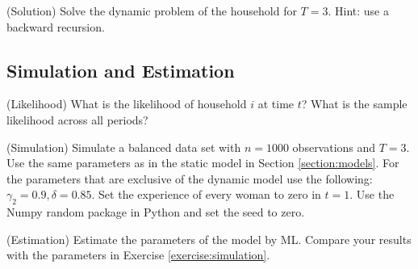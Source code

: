 \begin{exercise} (Solution)
Solve the dynamic problem of the household for $T=3$. Hint: use a backward recursion.
\end{exercise}

\subsection{Simulation and Estimation}

\begin{exercise} (Likelihood)
What is the likelihood of household $i$ at time $t$? What is the sample likelihood across all periods?
\end{exercise}

\begin{exercise} (Simulation) \label{exercise:simulation}
Simulate a balanced data set with $n = 1000$ observations and $T=3$. Use the same parameters as in the static model in Section \ref{section:models}. For the parameters that are exclusive of the dynamic model use the following: $\gamma_2 = 0.9,\delta = 0.85$. Set the experience of every woman to zero in $t=1$. Use the Numpy random package in Python and set the seed to zero.
\end{exercise}

\begin{exercise} (Estimation)
Estimate the parameters of the model by ML. Compare your results with the parameters in Exercise \ref{exercise:simulation}.
\end{exercise} 